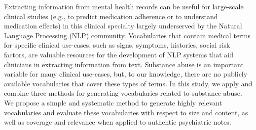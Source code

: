 Extracting information from mental health records can be useful for large-scale clinical studies (e.g., to predict medication adherence or to understand medication effects) in this clinical specialty largely underserved by the Natural Language Processing (NLP) community. Vocabularies that contain medical terms for specific clinical use-cases, such as signs, symptoms, histories, social risk factors, are valuable resources for the development of NLP systems that aid clinicians in extracting information from text. Substance abuse is an important variable for many clinical use-cases, but, to our knowledge, there are no publicly available vocabularies that cover these types of terms. In this study, we apply and combine three methods for generating vocabularies related to substance abuse. We propose a simple and systematic method to generate highly relevant vocabularies and evaluate these vocabularies with respect to size and content, as well as coverage and relevance when applied to authentic psychiatric notes.
